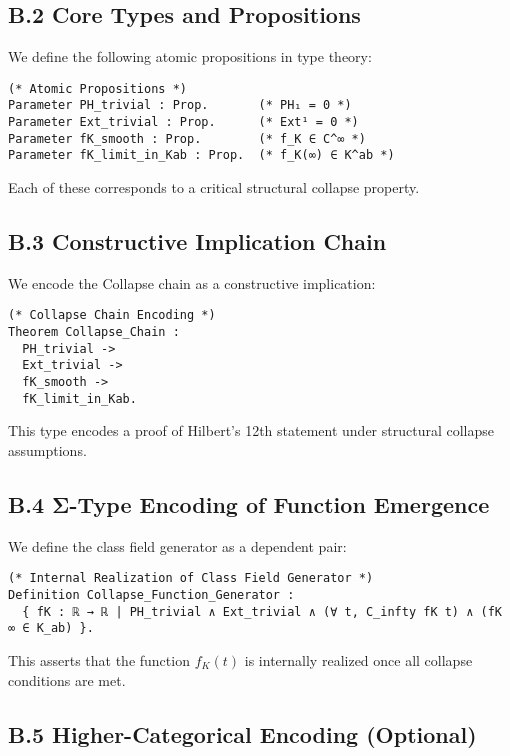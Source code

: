 \documentclass[11pt]{article}
\begin{document}
\subsection*{B.2 Core Types and Propositions}

We define the following atomic propositions in type theory:

\begin{lstlisting}[language=Coq, caption=Atomic Collapse Propositions]
(* Atomic Propositions *)
Parameter PH_trivial : Prop.       (* PH₁ = 0 *)
Parameter Ext_trivial : Prop.      (* Ext¹ = 0 *)
Parameter fK_smooth : Prop.        (* f_K ∈ C^∞ *)
Parameter fK_limit_in_Kab : Prop.  (* f_K(∞) ∈ K^ab *)
\end{lstlisting}

Each of these corresponds to a critical structural collapse property.

\subsection*{B.3 Constructive Implication Chain}

We encode the Collapse chain as a constructive implication:

\begin{lstlisting}[language=Coq, caption=Collapse Chain Encoding]
(* Collapse Chain Encoding *)
Theorem Collapse_Chain :
  PH_trivial ->
  Ext_trivial ->
  fK_smooth ->
  fK_limit_in_Kab.
\end{lstlisting}

This type encodes a proof of Hilbert’s 12th statement under structural collapse assumptions.

\subsection*{B.4 Σ-Type Encoding of Function Emergence}

We define the class field generator as a dependent pair:

\begin{lstlisting}[language=Coq, caption=Dependent Σ-Type Realization]
(* Internal Realization of Class Field Generator *)
Definition Collapse_Function_Generator : 
  { fK : ℝ → ℝ | PH_trivial ∧ Ext_trivial ∧ (∀ t, C_infty fK t) ∧ (fK ∞ ∈ K_ab) }.
\end{lstlisting}

This asserts that the function \( f_K(t) \) is internally realized once all collapse conditions are met.

\subsection*{B.5 Higher-Categorical Encoding (Optional)}
\end{document}
